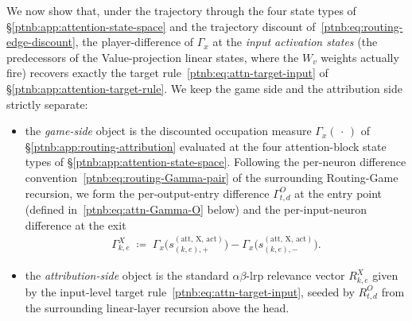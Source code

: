 We now show that, under the trajectory through the four state types of
\S\ref{ptnb:app:attention-state-space} and the trajectory discount of~\eqref{ptnb:eq:routing-edge-discount},
the player-difference of $\Gamma_x$ at the \emph{input activation states} (the predecessors of the
Value-projection linear states, where the $W_v$ weights actually fire) recovers exactly the target
rule~\eqref{ptnb:eq:attn-target-input} of \S\ref{ptnb:app:attention-target-rule}. We keep the game side and
the attribution side strictly separate:
\begin{itemize}
    \item the \emph{game-side} object is the discounted occupation measure $\Gamma_x(\,\cdot\,)$ of
        \S\ref{ptnb:app:routing-attribution} evaluated at the four attention-block state types of
        \S\ref{ptnb:app:attention-state-space}. Following the per-neuron difference
        convention~\eqref{ptnb:eq:routing-Gamma-pair} of the surrounding Routing-Game recursion, we form the
        per-output-entry difference $\Gamma^{O}_{t,d}$ at the entry point (defined
        in~\eqref{ptnb:eq:attn-Gamma-O} below) and the per-input-neuron difference at the exit
        \begin{align}\label{ptnb:eq:attn-Gamma-X}
            \Gamma^{X}_{k,e} \;\coloneqq\;
            \Gamma_x\!\bigl(s_{(k,e),+}^{(\mathrm{att},\,\mathrm{X},\,\mathrm{act})}\bigr) -
            \Gamma_x\!\bigl(s_{(k,e),-}^{(\mathrm{att},\,\mathrm{X},\,\mathrm{act})}\bigr).
        \end{align}
    \item the \emph{attribution-side} object is the standard $\alpha\beta$-\ac{lrp} relevance vector
        $R^{X}_{k,e}$ given by the input-level target rule~\eqref{ptnb:eq:attn-target-input}, seeded by
        $R^{O}_{t,d}$ from the surrounding linear-layer recursion above the head.
\end{itemize}

